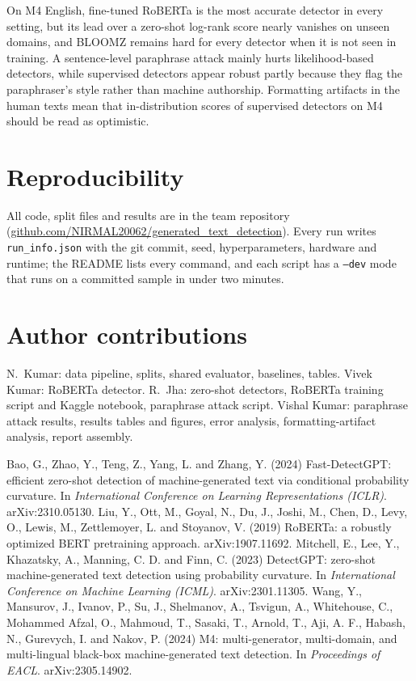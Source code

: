 \documentclass[11pt,a4paper]{article}
\begin{document}
On M4 English, fine-tuned RoBERTa is the most accurate detector in every setting, but its lead over a zero-shot
log-rank score nearly vanishes on unseen domains, and BLOOMZ remains hard for every detector when it is not seen in
training. A sentence-level paraphrase attack mainly hurts likelihood-based detectors, while supervised detectors
appear robust partly because they flag the paraphraser's style rather than machine authorship. Formatting artifacts
in the human texts mean that in-distribution scores of supervised detectors on M4 should be read as optimistic.

\section*{Reproducibility}
All code, split files and results are in the team repository
(\url{github.com/NIRMAL20062/generated_text_detection}). Every run writes \texttt{run\_info.json} with the git
commit, seed, hyperparameters, hardware and runtime; the README lists every command, and each script has a
\texttt{--dev} mode that runs on a committed sample in under two minutes.

\section*{Author contributions}
N.\ Kumar: data pipeline, splits, shared evaluator, baselines, tables. Vivek Kumar: RoBERTa detector.
R.\ Jha: zero-shot detectors, RoBERTa training script and Kaggle notebook, paraphrase attack script.
Vishal Kumar: paraphrase attack results, results tables and figures, error analysis, formatting-artifact analysis, report assembly.

\begin{thebibliography}{}
   Bao, G., Zhao, Y., Teng, Z., Yang, L. and Zhang, Y. (2024) Fast-DetectGPT: efficient zero-shot detection of
   machine-generated text via conditional probability curvature. In {\it International Conference on Learning
   Representations (ICLR)}. arXiv:2310.05130.
   Liu, Y., Ott, M., Goyal, N., Du, J., Joshi, M., Chen, D., Levy, O., Lewis, M., Zettlemoyer, L. and Stoyanov, V.
   (2019) RoBERTa: a robustly optimized BERT pretraining approach. arXiv:1907.11692.
   Mitchell, E., Lee, Y., Khazatsky, A., Manning, C. D. and Finn, C. (2023) DetectGPT: zero-shot machine-generated
   text detection using probability curvature. In {\it International Conference on Machine Learning (ICML)}.
   arXiv:2301.11305.
   Wang, Y., Mansurov, J., Ivanov, P., Su, J., Shelmanov, A., Tsvigun, A., Whitehouse, C., Mohammed Afzal, O.,
   Mahmoud, T., Sasaki, T., Arnold, T., Aji, A. F., Habash, N., Gurevych, I. and Nakov, P. (2024) M4:
   multi-generator, multi-domain, and multi-lingual black-box machine-generated text detection. In {\it Proceedings
   of EACL}. arXiv:2305.14902.
\end{thebibliography}

\label{lastpage}
\end{document}
